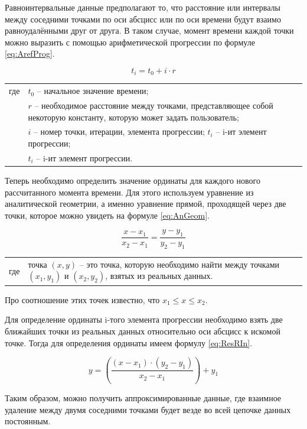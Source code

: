 {\standartFont

  \par Равноинтервальные данные предполагают то, что расстояние или интервалы между соседними точками по оси абсцисс или по оси времени будут взаимо равноудалёнными друг от друга. В таком случае, момент времени каждой точки можно выразить с помощью арифметической прогрессии по формуле \ref{eq:ArefProg}.

  \begin{equation} \label{eq:ArefProg}
    t_i = t_0 + i \cdot r
  \end{equation}

  \begin{tabular}{p{}p{}}
		где  & $t_0$ {--} начальное значение времени; \\
		 	   & $r$ {--} необходимое расстояние между точками, представляющее собой некоторую константу, которую может задать пользователь; \\
     	   & $i$ {--} номер точки, итерации, элемента прогрессии; $t_i$ {--} i-ит элемент прогрессии;  \\
     	   & $t_i$ {--} i-ит элемент прогрессии. \\
  \end{tabular}

  \par Теперь необходимо определить значение ординаты для каждого нового рассчитанного момента времени. Для этого используем уравнение из аналитической геометрии, а именно уравнение прямой, проходящей через две точки, которое можно увидеть на формуле \ref{eq:AnGeom}.

  \begin{equation} \label{eq:AnGeom}
    \frac{x - x_1}{x_2 - x_1} = \frac{y - y_1}{y_2 - y_1}
  \end{equation}

  \begin{tabular}{p{}p{}}
    где  & точка $\left(x, y\right)$ {--} это точка, которую необходимо найти между точками $\left(x_1, y_1\right)$ и $\left(x_2, y_2\right)$, взятых из реальных данных. \\
  \end{tabular}

  \par Про соотношение этих точек известно, что $x_1 \leq x \leq x_2$.

  \par Для определение ординаты i-того элемента прогрессии необходимо взять две ближайших точки из реальных данных относительно оси абсцисс к искомой точке. Тогда для определения ординаты имеем формулу \ref{eq:ResRIn}.

  \begin{equation} \label{eq:ResRIn}
    y = \left(\frac{\left(x - x_1\right) \cdot \left(y_2 - y_1\right)}{x_2 - x_1}\right) + y_1
  \end{equation}

  \par Таким образом, можно получить аппроксимированные данные, где взаимное удаление между двумя соседними точками будет везде во всей цепочке данных постоянным.  

  \par 
}

